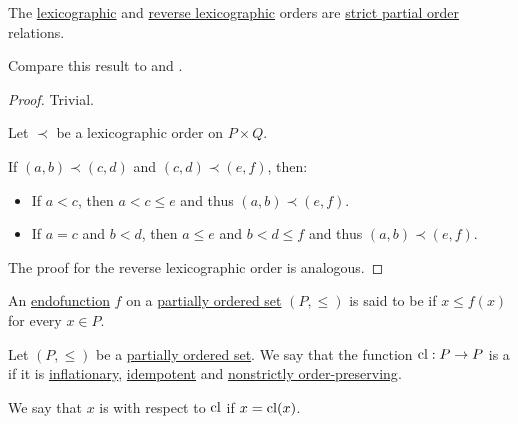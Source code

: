 \begin{proposition}\label{thm:lexicographic_order_is_partial_order}
  The \hyperref[eq:def:lexicographic_order]{lexicographic} and \hyperref[eq:def:lexicographic_order/reverse]{reverse lexicographic} orders are \hyperref[def:partially_ordered_set/strict]{strict partial order} relations.

  Compare this result to  and .
\end{proposition}
\begin{proof}
   Trivial.

   Let \( \prec \) be a lexicographic order on \( P \times Q \).

  If \( (a, b) \prec (c, d) \) and \( (c, d) \prec (e, f) \), then:
  \begin{itemize}
    \item If \( a < c \), then \( a < c \leq e \) and thus \( (a, b) \prec (e, f) \).

    \item If \( a = c \) and \( b < d \), then \( a \leq e \) and \( b < d \leq f \) and thus \( (a, b) \prec (e, f) \).
  \end{itemize}

   The proof for the reverse lexicographic order is analogous.
\end{proof}

\begin{definition}\label{def:inflationary_function}
  An \hyperref[def:multi_valued_function/endofunction]{endofunction} \( f \) on a \hyperref[def:partially_ordered_set]{partially ordered set} \( (P, \leq) \) is said to be  if \( x \leq f(x) \) for every \( x \in P \).
\end{definition}

\begin{definition}\label{def:closure_operator}
  Let \( (P, \leq) \) be a \hyperref[def:partially_ordered_set]{partially ordered set}. We say that the function \( \operatorname{cl}: P \to P \) is a  if it is \hyperref[def:inflationary_function]{inflationary}, \hyperref[def:magma/idempotent]{idempotent} and \hyperref[eq:def:partially_ordered_set/homomorphism/nonstrict]{nonstrictly order-preserving}.

  We say that \( x \) is  with respect to \( \operatorname{cl} \) if \( x = \operatorname{cl}(x) \).
\end{definition}

